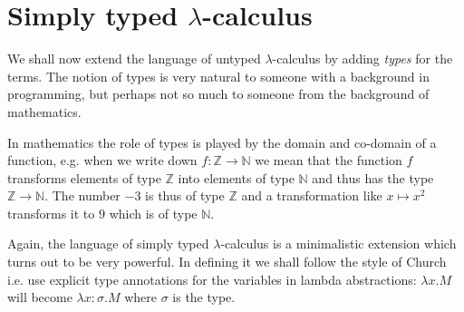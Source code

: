 \section{Simply typed $\lambda$-calculus}

We shall now extend the language of untyped $\lambda$-calculus by
adding \emph{types} for the terms. The notion of types is very natural to
someone with a background in programming, but perhaps not so much to someone
from the background of mathematics.

In mathematics the role of types is played by the domain and co-domain of a
function, e.g. when we write down $f: \mathbb{Z} \rightarrow \mathbb{N}$ we
mean that the function $f$ transforms elements of type $\mathbb{Z}$ into
elements of type $\mathbb{N}$ and thus has the type $\mathbb{Z} \rightarrow
\mathbb{N}$. The number $-3$ is thus of type $\mathbb{Z}$ and a transformation like
$x \mapsto x^2$ transforms it to $9$ which is of type $\mathbb{N}$.

Again, the language of simply typed $\lambda$-calculus is a minimalistic
extension which turns out to be very powerful. In defining it we shall follow
the style of Church i.e. use explicit type annotations for the variables in lambda
abstractions: $\lambda x. M$ will become $\lambda x:\sigma. M$ where
$\sigma$ is the type.

